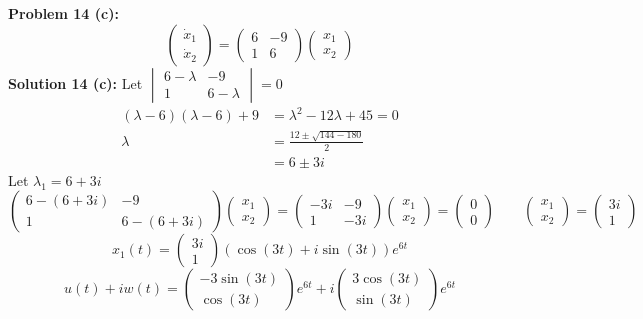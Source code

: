 \documentclass[12pt]{article}
\begin{document}
\noindent \textbf{Problem 14 (c): } 
$$
\begin{pmatrix}
\dot{x}_1 \\
\dot{x}_2
\end{pmatrix} = 
\begin{pmatrix}
6 & -9 \\
1 & 6
\end{pmatrix}
\begin{pmatrix}
x_1 \\
x_2
\end{pmatrix}
$$
\noindent \textbf{Solution 14 (c): } Let 
$
\begin{vmatrix}
6 - \lambda & -9 \\
1 & 6 - \lambda
\end{vmatrix} = 0
$
\begin{align*}
(\lambda - 6)(\lambda - 6) + 9 &=  \lambda^2 - 12\lambda + 45 = 0 \\
\lambda &= \frac{12 \pm \sqrt{144 - 180}}{2} \\
&= 6 \pm 3i
\end{align*}
Let $\lambda_1 = 6 + 3i$
$$\begin{pmatrix}
6 - (6 + 3i)  & -9 \\
1 & 6 - (6 + 3i)
\end{pmatrix}
\begin{pmatrix}
x_1 \\
x_2
\end{pmatrix} = 
\begin{pmatrix}
-3i & -9 \\
1 & -3i
\end{pmatrix}
\begin{pmatrix}
x_1 \\
x_2
\end{pmatrix} = 
\begin{pmatrix}
0 \\
0
\end{pmatrix} \qquad 
\begin{pmatrix}
x_1 \\
x_2
\end{pmatrix} = 
\begin{pmatrix}
3i \\
1
\end{pmatrix}$$
$$
x_1(t) = 
\begin{pmatrix}
3i \\
1
\end{pmatrix}
\left( \cos(3t) + i\sin(3t) \right) e^{6t}
$$
$$
u(t) + iw(t) = 
\begin{pmatrix}
-3\sin(3t) \\
\cos(3t)
\end{pmatrix}e^{6t} + 
i \begin{pmatrix}
3\cos(3t) \\
\sin(3t)
\end{pmatrix}e^{6t}
$$
\end{document}
